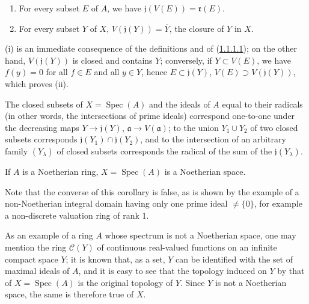 \begin{proposition}[1.1.4]
\label{I.1.1.4}
\begin{enumerate}
  \item[\rm(i)] For every subset $E$ of $A$, we have
  $\mathfrak{j}(V(E))=\mathfrak{r}(E)$.
  \item[\rm(ii)] For every subset $Y$ of $X$,
  $V(\mathfrak{j}(Y))=\overline{Y}$, the closure of $Y$ in $X$.
\end{enumerate}
\end{proposition}

(i) is an immediate consequence of the definitions and of
(\hyperref[I.1.1.1.1]{1.1.1.1}); on the other hand,
$V(\mathfrak{j}(Y))$ is closed and contains $Y$; conversely, if
$Y\subset V(E)$, we have $f(y)=0$ for all $f\in E$ and all $y\in Y$, hence
$E\subset\mathfrak{j}(Y)$, $V(E)\supset V(\mathfrak{j}(Y))$, which proves
(ii).

\begin{corollary}[1.1.5]
\label{I.1.1.5}
The closed subsets of $X=\operatorname{Spec}(A)$ and the ideals of $A$ equal
to their radicals (in other words, the intersections of prime ideals)
correspond one-to-one under the decreasing maps
$Y\to\mathfrak{j}(Y)$, $\mathfrak{a}\to V(\mathfrak{a})$; to the
union $Y_1\cup Y_2$ of two closed subsets corresponds
$\mathfrak{j}(Y_1)\cap\mathfrak{j}(Y_2)$, and to the intersection of an
arbitrary family $(Y_\lambda)$ of closed subsets corresponds the radical of
the sum of the $\mathfrak{j}(Y_\lambda)$.
\end{corollary}

\begin{corollary}[1.1.6]
\label{I.1.1.6}
If $A$ is a Noetherian ring, $X=\operatorname{Spec}(A)$ is a Noetherian
space.
\end{corollary}

Note that the converse of this corollary is false, as is shown by the
example of a non-Noetherian integral domain having only one prime ideal
$\neq\{0\}$, for example a non-discrete valuation ring of rank 1.

As an example of a ring $A$ whose spectrum is not a Noetherian space, one
may mention the ring $\mathcal{C}(Y)$ of continuous real-valued functions on
an infinite compact space $Y$; it is known that, as a set, $Y$ can be
identified with the set of maximal ideals of $A$, and it is easy to see that
the topology induced on $Y$ by that of $X=\operatorname{Spec}(A)$ is the
original topology of $Y$. Since $Y$ is not a Noetherian space, the same is
therefore true of $X$.

